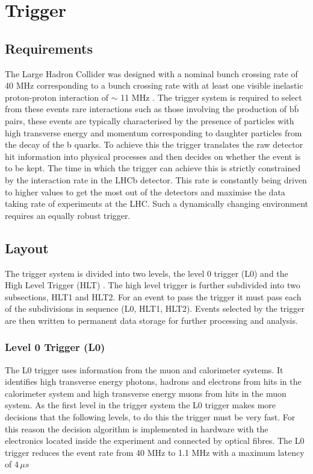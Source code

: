 \section{Trigger}
\label{section: trigger}

\subsection*{Requirements}

The Large Hadron Collider was designed with a nominal bunch crossing rate of 40 MHz corresponding to a bunch crossing rate with at least one visible inelastic proton-proton interaction of $\sim$ 11 MHz \cite{Aaij:1493820}. The trigger system is required to select from these events rare interactions such as those involving the production of $\mathrm{b}\bar{\mathrm{b}}$ pairs, these events are typically characterised by the presence of particles with high transverse energy and momentum corresponding to daughter particles from the decay of the b quarks. To achieve this the trigger translates the raw detector hit information into physical processes and then decides on whether the event is to be kept. The time in which the trigger can achieve this is strictly constrained by the interaction rate in the LHCb detector. This rate is constantly being driven to higher values to get the most out of the detectors and maximise the data taking rate of experiments at the LHC. Such a dynamically changing environment requires an equally robust trigger.

\subsection*{Layout}

The trigger system is divided into two levels, the level 0 trigger (L0) and the High Level Trigger (HLT) \cite{Antunes-Nobrega:630828}. The high level trigger is further subdivided into two subsections, HLT1 and HLT2. For an event to pass the trigger it must pass each of the subdivisions in sequence (L0, HLT1, HLT2). Events selected by the trigger are then written to permanent data storage for further processing and analysis.

\subsubsection*{Level 0 Trigger (L0)}
The L0 trigger uses information from the muon and calorimeter systems. It identifies high transverse energy photons, hadrons and electrons from hits in the calorimeter system and high transverse energy muons from hits in the muon system. As the first level in the trigger system the L0 trigger makes more decisions that the following levels, to do this the trigger must be very fast. For this reason the decision algorithm is implemented in hardware with the electronics located inside the experiment and connected by optical fibres. The L0 trigger reduces the event rate from 40 MHz to 1.1 MHz with a maximum latency of $4\, \mu s$

